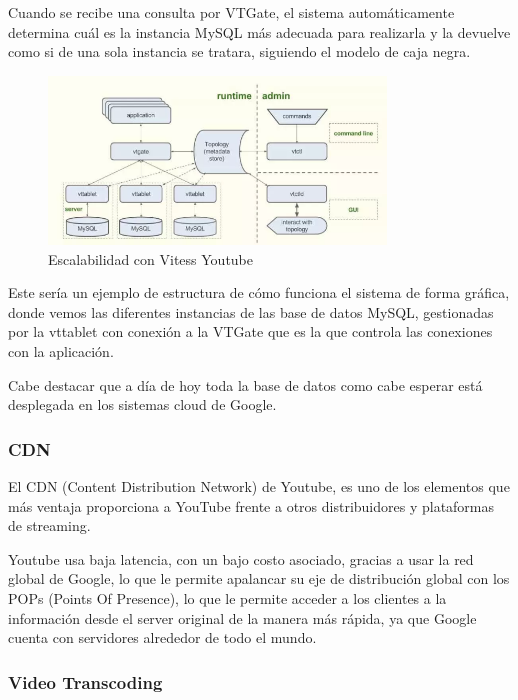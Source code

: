 \documentclass[12pt,a4paper]{article}
\begin{document}
    Cuando se recibe una consulta por VTGate, el sistema automáticamente determina cuál es la instancia MySQL más adecuada para realizarla y la devuelve como si de una sola instancia se tratara, siguiendo el modelo de caja negra. 

    \begin{figure}[H]
        \centering
        \includegraphics[width=0.8\textwidth]{./img/escalabilidad_vitess.png}
        \caption{Escalabilidad con Vitess Youtube}
        \label{fig:escalabilidad_vitess_youtube}
    \end{figure}

    Este sería un ejemplo de estructura de cómo funciona el sistema de forma gráfica, donde vemos las diferentes instancias de las base de datos MySQL, gestionadas por la vttablet con conexión a la VTGate que es la que controla las conexiones con la aplicación. 

    Cabe destacar que a día de hoy toda la base de datos como cabe esperar está desplegada en los sistemas cloud de Google.

    \subsubsection{CDN}

    El CDN (Content Distribution Network) de Youtube, es uno de los elementos que más ventaja proporciona a YouTube frente a otros distribuidores y plataformas de streaming.

    Youtube usa baja latencia, con un bajo costo asociado, gracias a usar la red global de Google, lo que le permite apalancar su eje de distribución global con los POPs (Points Of Presence), lo que le permite acceder a los clientes a la información desde el server original de la manera más rápida, ya que Google cuenta con servidores alrededor de todo el mundo. 

    \subsubsection{Video Transcoding}
\end{document}
